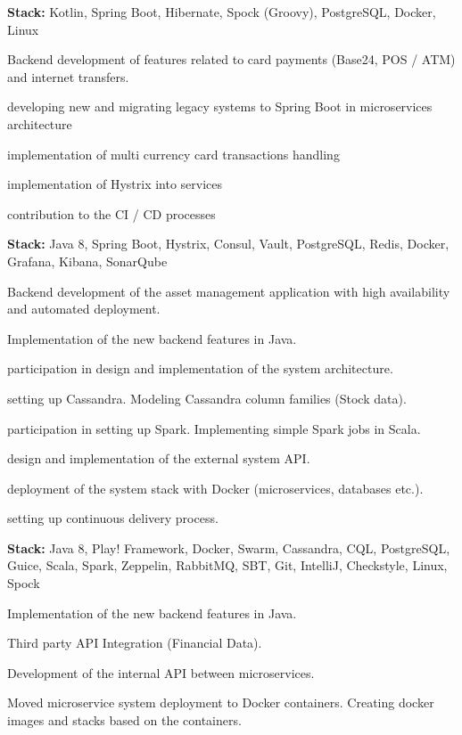 \textbf{Stack:} Kotlin, Spring Boot, Hibernate, Spock (Groovy), PostgreSQL, Docker, Linux
\sectionsep

Backend development of features related to card payments (Base24, POS / ATM) and internet transfers. 
\begin{tightemize}
\item developing new and migrating legacy systems to Spring Boot in microservices architecture
\item implementation of multi currency card transactions handling
\item implementation of Hystrix into services
\item contribution to the CI / CD processes
\end{tightemize}

\textbf{Stack:} Java 8, Spring Boot, Hystrix, Consul, Vault, PostgreSQL, Redis, Docker, Grafana, Kibana, SonarQube
\sectionsep

Backend development of the asset management application with high availability and automated deployment.
\begin{tightemize}
\item Implementation of the new backend features in Java.
\item participation in design and implementation of the system architecture. 
\item setting up Cassandra. Modeling Cassandra column families (Stock data).
\item participation in setting up Spark. Implementing simple Spark jobs in Scala. 
\item design and implementation of the external system API.
\item deployment of the system stack with Docker (microservices, databases etc.).
\item setting up continuous delivery process.
\end{tightemize}

\textbf{Stack:} Java 8, Play! Framework, Docker, Swarm, Cassandra, CQL, PostgreSQL, Guice, Scala, Spark, Zeppelin, RabbitMQ, SBT, Git, IntelliJ, Checkstyle, Linux, Spock
\sectionsep

\begin{tightemize}
\item Implementation of the new backend features in Java.
\item Third party API Integration (Financial Data).
\item Development of the internal API between microservices.
\item Moved microservice system deployment to Docker containers. Creating docker images and stacks based on the containers.
\end{tightemize}

